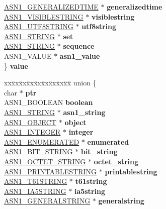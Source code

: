 \begin{DoxyCompactItemize}
\begin{tabbing}
\>\hyperlink{structasn1__string__st}{ASN1\_GENERALIZEDTIME} $\ast$ {\bfseries generalizedtime}\\
\>\hyperlink{structasn1__string__st}{ASN1\_VISIBLESTRING} $\ast$ {\bfseries visiblestring}\\
\>\hyperlink{structasn1__string__st}{ASN1\_UTF8STRING} $\ast$ {\bfseries utf8string}\\
\>\hyperlink{structasn1__string__st}{ASN1\_STRING} $\ast$ {\bfseries set}\\
\>\hyperlink{structasn1__string__st}{ASN1\_STRING} $\ast$ {\bfseries sequence}\\
\>ASN1\_VALUE $\ast$ {\bfseries asn1\_value}\\
\} {\bfseries value}\\

\end{tabbing}\item 
\mbox{\label{structasn1__type__st_a3877c265a6e1b15c3facbef15b4782ec}} 
\begin{tabbing}
xx\=xx\=xx\=xx\=xx\=xx\=xx\=xx\=xx\=\kill
union \{\\
\>char $\ast$ {\bfseries ptr}\\
\>ASN1\_BOOLEAN {\bfseries boolean}\\
\>\hyperlink{structasn1__string__st}{ASN1\_STRING} $\ast$ {\bfseries asn1\_string}\\
\>\hyperlink{structasn1__object__st}{ASN1\_OBJECT} $\ast$ {\bfseries object}\\
\>\hyperlink{structasn1__string__st}{ASN1\_INTEGER} $\ast$ {\bfseries integer}\\
\>\hyperlink{structasn1__string__st}{ASN1\_ENUMERATED} $\ast$ {\bfseries enumerated}\\
\>\hyperlink{structasn1__string__st}{ASN1\_BIT\_STRING} $\ast$ {\bfseries bit\_string}\\
\>\hyperlink{structasn1__string__st}{ASN1\_OCTET\_STRING} $\ast$ {\bfseries octet\_string}\\
\>\hyperlink{structasn1__string__st}{ASN1\_PRINTABLESTRING} $\ast$ {\bfseries printablestring}\\
\>\hyperlink{structasn1__string__st}{ASN1\_T61STRING} $\ast$ {\bfseries t61string}\\
\>\hyperlink{structasn1__string__st}{ASN1\_IA5STRING} $\ast$ {\bfseries ia5string}\\
\>\hyperlink{structasn1__string__st}{ASN1\_GENERALSTRING} $\ast$ {\bfseries generalstring}\\

\end{tabbing}
\end{DoxyCompactItemize}
